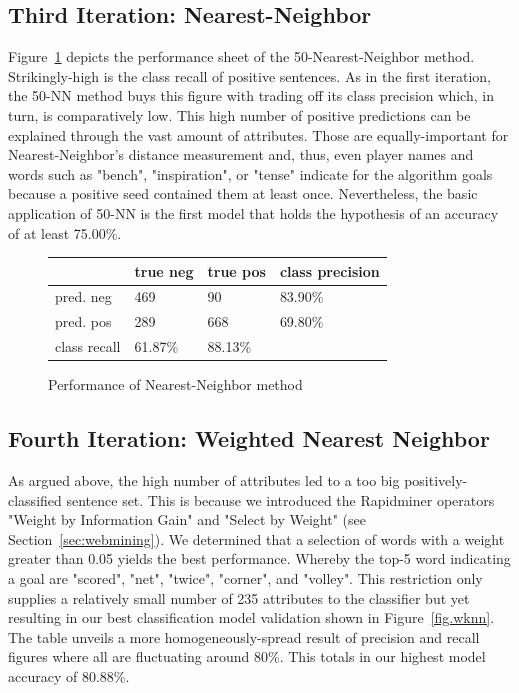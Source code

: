 \documentclass[11pt,titlepage,oneside,openany]{book}
\begin{document}
\subsection{Third Iteration: Nearest-Neighbor}
\label{sec:knn}

Figure~\ref{fig.knn} depicts the performance sheet of the 50-Nearest-Neighbor method. Strikingly-high is the class recall of positive sentences. As in the first iteration, the 50-NN method buys this figure with trading off its class precision which, in turn, is comparatively low. This high number of positive predictions can be explained through the vast amount of attributes. Those are equally-important for Nearest-Neighbor's distance measurement and, thus, even player names and words such as "bench", "inspiration", or "tense" indicate for the algorithm goals because a positive seed contained them at least once. Nevertheless, the basic application of 50-NN is the first model that holds the hypothesis of an accuracy of at least 75.00\%.

\begin{figure} [h!]
\centering
\begin{tabular}{ | l | l | l | l | }
\hline
	 & true neg & true pos & class precision \\ \hline
	pred. neg & 469 & 90 & 83.90\% \\ \hline
	pred. pos & 289 & 668 & 69.80\% \\ \hline
	class recall & 61.87\% & 88.13\% &  \\ \hline
\end{tabular}
\caption{Performance of Nearest-Neighbor method}
\label{fig.knn}
\end{figure}

\subsection{Fourth Iteration: Weighted Nearest Neighbor}
\label{sec:wknn}
As argued above, the high number of attributes led to a too big positively-classified sentence set. This is because we introduced the Rapidminer operators "Weight by Information Gain" and "Select by Weight" (see Section~\ref{sec:webmining}). We determined that a selection of words with a weight greater than 0.05 yields the best performance. Whereby the top-5 word indicating a goal are "scored", "net", "twice", "corner", and "volley". This restriction only supplies a relatively small number of 235 attributes to the classifier but yet resulting in our best classification model validation shown in Figure~\ref{fig.wknn}. The table unveils a more homogeneously-spread result of precision and recall figures where all are fluctuating around 80\%. This totals in our highest model accuracy of 80.88\%.
\end{document}
